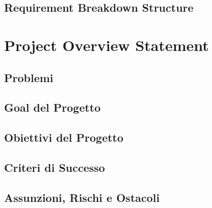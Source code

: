 \subsection{Requirement Breakdown Structure}

\section{Project Overview Statement}

\subsection{Problemi}

\subsection{Goal del Progetto}

\subsection{Obiettivi del Progetto}

\subsection{Criteri di Successo}

\subsection{Assunzioni, Rischi e Ostacoli}